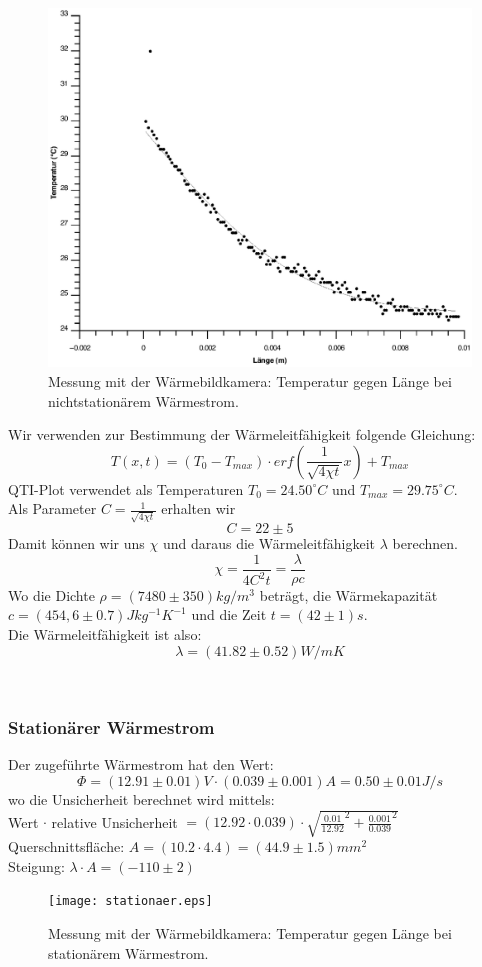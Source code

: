 \documentclass[12pt,a4paper,twopage]{article}
\begin{document}
\begin{figure}[H]
\centering
\includegraphics[scale=0.8]{nichtstationaer.eps}
\caption{Messung mit der Wärmebildkamera: Temperatur gegen Länge bei nichtstationärem Wärmestrom.}
\end{figure}

Wir verwenden zur Bestimmung der Wärmeleitfähigkeit folgende Gleichung:
$$T(x,t)=(T_0 - T_{max}) \cdot erf\left(\frac{1}{\sqrt{4\chi t}}x\right) + T_{max}$$
QTI-Plot verwendet als Temperaturen $T_0=24.50^\circ C$ und $T_{max}=29.75^\circ C$.\\
Als Parameter $C=\frac{1}{\sqrt{4\chi t}}$ erhalten wir
$$C=22 \pm 5$$
Damit können wir uns $\chi$ und daraus die Wärmeleitfähigkeit $\lambda$ berechnen.
$$\chi = \frac{1}{4C^2 t}=\frac{\lambda}{\rho c}$$
Wo die Dichte $\rho = (7480 \pm 350)kg/m^3$ beträgt, die Wärmekapazität $c=(454,6 \pm 0.7)Jkg^{-1}K^{-1}$ und die Zeit $t=(42 \pm 1)s$.\\
Die Wärmeleitfähigkeit ist also:
$$\boxed{\lambda = (41.82 \pm 0.52)W/m K}$$

\\
\subsubsection{Stationärer Wärmestrom}
Der zugeführte Wärmestrom hat den Wert:
$$\Phi=(12.91 \pm 0.01)V \cdot (0.039 \pm 0.001)A=0.50 \pm 0.01 J/s$$
wo die Unsicherheit berechnet wird mittels:\\
Wert $\cdot$ relative Unsicherheit $= (12.92 \cdot 0.039) \cdot \sqrt{\frac{0.01}{12.92}^2 + \frac{0.001}{0.039}^2}$\\
Querschnittsfläche: $A=(10.2 \cdot 4.4)=(44.9 \pm 1.5)mm^2$\\
Steigung: $\lambda \cdot A = (-110 \pm 2)$\\
\begin{figure}[H]
\centering
\texttt{[image: stationaer.eps]}
\caption{Messung mit der Wärmebildkamera: Temperatur gegen Länge bei stationärem Wärmestrom.}
\end{figure}
\end{document}
